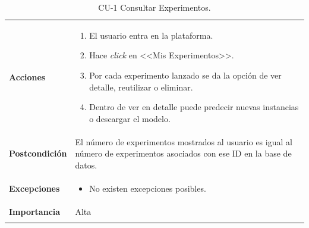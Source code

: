 \begin{longtable}[H]{@{}ll@{}}
\begin{minipage}[t]{0.23\columnwidth}\raggedright\strut
\textbf{Acciones}\strut
\end{minipage} & \begin{minipage}[t]{0.71\columnwidth}\raggedright\strut
\begin{enumerate}
\def\labelenumi{\arabic{enumi}.}
\tightlist
\item El usuario entra en la plataforma.
\item Hace \textit{click} en <<Mis Experimentos>>.
\item Por cada experimento lanzado se da la opción de ver detalle, reutilizar o eliminar.
\item Dentro de ver en detalle puede predecir nuevas instancias o descargar el modelo.
\end{enumerate}\strut
\end{minipage}\tabularnewline
\begin{minipage}[t]{0.23\columnwidth}\raggedright\strut
\textbf{Postcondición}\strut
\end{minipage} & \begin{minipage}[t]{0.71\columnwidth}\raggedright\strut
El número de experimentos mostrados al usuario es igual al número de experimentos asociados con ese ID en la base de datos.\strut
\end{minipage}\tabularnewline
\begin{minipage}[t]{0.23\columnwidth}\raggedright\strut
\textbf{Excepciones}\strut
\end{minipage} & \begin{minipage}[t]{0.71\columnwidth}\raggedright\strut
\begin{itemize}
\tightlist
\item No existen excepciones posibles.
\end{itemize}\strut
\end{minipage}\tabularnewline
\begin{minipage}[t]{0.23\columnwidth}\raggedright\strut
\textbf{Importancia}\strut
\end{minipage} & \begin{minipage}[t]{0.71\columnwidth}\raggedright\strut
Alta\strut
\end{minipage}\tabularnewline
\bottomrule
\caption{CU-1 Consultar Experimentos.}
\end{longtable}